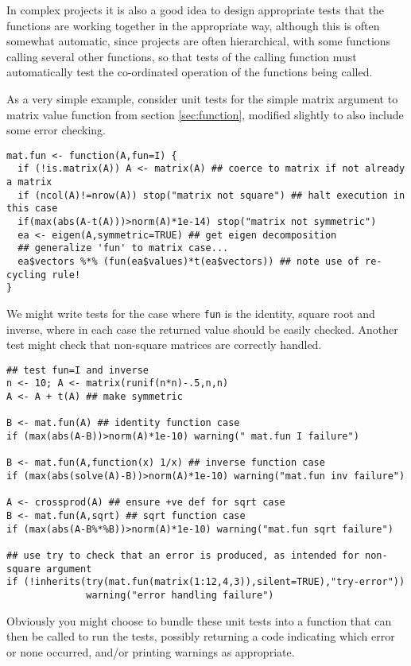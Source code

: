 \documentclass[10pt] {article}
\theoremstyle{definition}
\begin{document}
In complex projects it is also a good idea to design appropriate tests that the functions are working together in the appropriate way, although this is often somewhat automatic, since projects are often hierarchical, with some functions calling  several other functions, so that tests of the calling function must automatically test the co-ordinated operation of the functions being called.  

As a very simple example, consider unit tests for the simple matrix argument to matrix value function from section \ref{sec:function}, modified slightly to also include some error checking.
\begin{lstlisting}
mat.fun <- function(A,fun=I) {
  if (!is.matrix(A)) A <- matrix(A) ## coerce to matrix if not already a matrix
  if (ncol(A)!=nrow(A)) stop("matrix not square") ## halt execution in this case
  if(max(abs(A-t(A)))>norm(A)*1e-14) stop("matrix not symmetric")
  ea <- eigen(A,symmetric=TRUE) ## get eigen decomposition
  ## generalize 'fun' to matrix case...
  ea$vectors %*% (fun(ea$values)*t(ea$vectors)) ## note use of re-cycling rule!
}
\end{lstlisting}
We might write tests for the case where \verb+fun+ is the identity, square root and inverse, where in each case the returned value should be easily checked. Another test might check that non-square matrices are correctly handled. 
\begin{lstlisting}
## test fun=I and inverse
n <- 10; A <- matrix(runif(n*n)-.5,n,n)
A <- A + t(A) ## make symmetric

B <- mat.fun(A) ## identity function case
if (max(abs(A-B))>norm(A)*1e-10) warning(" mat.fun I failure")

B <- mat.fun(A,function(x) 1/x) ## inverse function case
if (max(abs(solve(A)-B))>norm(A)*1e-10) warning("mat.fun inv failure")

A <- crossprod(A) ## ensure +ve def for sqrt case
B <- mat.fun(A,sqrt) ## sqrt function case
if (max(abs(A-B%*%B))>norm(A)*1e-10) warning("mat.fun sqrt failure")

## use try to check that an error is produced, as intended for non-square argument
if (!inherits(try(mat.fun(matrix(1:12,4,3)),silent=TRUE),"try-error")) 
              warning("error handling failure")
\end{lstlisting}
Obviously you might choose to bundle these unit tests into a function that can then be called to run the tests, possibly returning a code indicating which error or none occurred, and/or printing warnings as appropriate.  
\end{document}
